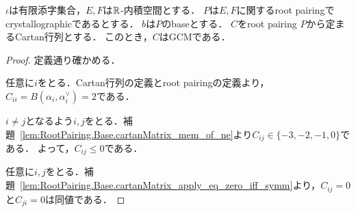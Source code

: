 \begin{theorem}
  \label{thm:rootSystem_isGCM}
  \leanok
  $\iota$は有限添字集合，$E, F$は$\mathbb{R}$-内積空間とする．
  $P$は$E, F$に関するroot pairingでcrystallographicであるとする．
  $b$は$P$のbaseとする．
  $C$をroot pairing $P$から定まるCartan行列とする．
  このとき，$C$はGCMである．
\end{theorem}

\begin{proof}
  定義通り確かめる．

  任意に$i$をとる．Cartan行列の定義とroot pairingの定義より，$C_{ii} = B(\alpha_i, \alpha^\vee_i) = 2$である．

  $i \ne j$となるよう$i, j$をとる．補題~\ref{lem:RootPairing.Base.cartanMatrix_mem_of_ne}より$C_{ij} \in \{-3, -2, -1, 0\}$である．
  よって，$C_{ij} \le 0$である．

  任意に$i, j$をとる．補題~\ref{lem:RootPairing.Base.cartanMatrix_apply_eq_zero_iff_symm}より，$C_{ij} = 0$と$C_{ji} = 0$は同値である．
\end{proof}